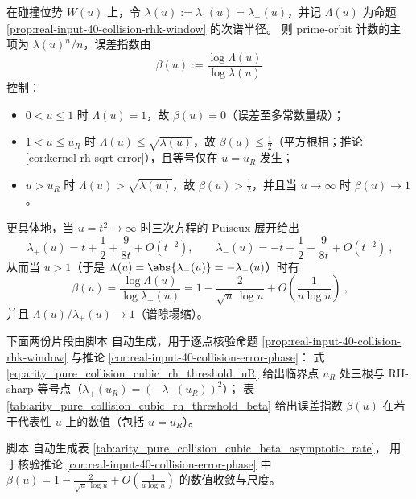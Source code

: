 \begin{corollary}[素轨道计数误差指数的相变：\texorpdfstring{$\beta(u)$}{beta(u)} 从 \texorpdfstring{$\le 1/2$}{<=1/2} 连续劣化到 \texorpdfstring{$1$}{1}]\label{cor:real-input-40-collision-error-phase}
在碰撞位势 \(W(u)\) 上，令 \(\lambda(u):=\lambda_1(u)=\lambda_+(u)\)，并记 \(\Lambda(u)\) 为命题 \ref{prop:real-input-40-collision-rhk-window} 的次谱半径。
则 prime-orbit 计数的主项为 \(\lambda(u)^n/n\)，误差指数由
\[
\beta(u):=\frac{\log \Lambda(u)}{\log \lambda(u)}
\]
控制：
\begin{itemize}
  \item \(0<u\le 1\) 时 \(\Lambda(u)=1\)，故 \(\beta(u)=0\)（误差至多常数量级）；
  \item \(1<u\le u_R\) 时 \(\Lambda(u)\le \sqrt{\lambda(u)}\)，故 \(\beta(u)\le \tfrac12\)（平方根相；推论 \ref{cor:kernel-rh-sqrt-error}），且等号仅在 \(u=u_R\) 发生；
  \item \(u>u_R\) 时 \(\Lambda(u)>\sqrt{\lambda(u)}\)，故 \(\beta(u)>\tfrac12\)，并且当 \(u\to\infty\) 时 \(\beta(u)\to 1\)。
\end{itemize}
\par
更具体地，当 \(u=t^2\to\infty\) 时三次方程的 Puiseux 展开给出
\[
\boxed{\ \lambda_+(u)=t+\frac12+\frac{9}{8t}+O(t^{-2}),\qquad
\lambda_-(u)=-t+\frac12-\frac{9}{8t}+O(t^{-2})\ } ,
\]
从而当 \(u>1\)（于是 \(\Lambda(u)=\abs{\lambda_-(u)}=-\lambda_-(u)\)）时有
\[
\boxed{\ \beta(u)=\frac{\log\Lambda(u)}{\log\lambda_+(u)}
=1-\frac{2}{\sqrt u\,\log u}+O\!\left(\frac{1}{u\log u}\right)\ } ,
\]
并且 \(\Lambda(u)/\lambda_+(u)\to 1\)（谱隙塌缩）。
\end{corollary}

\begin{remark}\label{rem:real-input-40-collision-beta-samples}
下面两份片段由脚本  自动生成，用于逐点核验命题 \ref{prop:real-input-40-collision-rhk-window} 与推论 \ref{cor:real-input-40-collision-error-phase}：
式 \eqref{eq:arity_pure_collision_cubic_rh_threshold_uR} 给出临界点 \(u_R\) 处三根与 RH-sharp 等号点（\(\lambda_+(u_R)=(-\lambda_-(u_R))^2\)）；
表 \ref{tab:arity_pure_collision_cubic_rh_threshold_beta} 给出误差指数 \(\beta(u)\) 在若干代表性 \(u\) 上的数值（包括 \(u=u_R\)）。
\end{remark}




\begin{remark}\label{rem:arity-pure-collision-cubic-beta-asymptotic-rate}
脚本  自动生成表 \ref{tab:arity_pure_collision_cubic_beta_asymptotic_rate}，
用于核验推论 \ref{cor:real-input-40-collision-error-phase} 中
\(
\beta(u)=1-\frac{2}{\sqrt u\,\log u}+O\!\left(\frac{1}{u\log u}\right)
\)
的数值收敛与尺度。
\end{remark}


